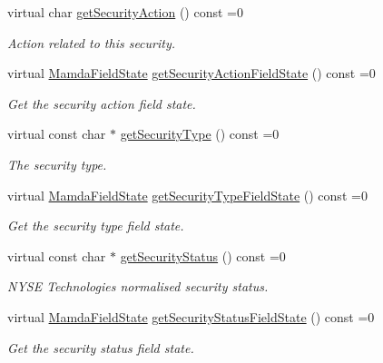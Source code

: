 \begin{CompactItemize}
\item 
virtual char \hyperlink{classWombat_1_1MamdaSecStatus_b143773aacba9fabb91693884ae8d87a}{get\-Security\-Action} () const =0
\begin{CompactList}\small\item\em Action related to this security. \item\end{CompactList}\item 
virtual \hyperlink{namespaceWombat_93aac974f2ab713554fd12a1fa3b7d2a}{Mamda\-Field\-State} \hyperlink{classWombat_1_1MamdaSecStatus_771481bb771bdd1bb86ab54be9e9247b}{get\-Security\-Action\-Field\-State} () const =0
\begin{CompactList}\small\item\em Get the security action field state. \item\end{CompactList}\item 
virtual const char $\ast$ \hyperlink{classWombat_1_1MamdaSecStatus_d3f39139bb90453ba077440f838b3d70}{get\-Security\-Type} () const =0
\begin{CompactList}\small\item\em The security type. \item\end{CompactList}\item 
virtual \hyperlink{namespaceWombat_93aac974f2ab713554fd12a1fa3b7d2a}{Mamda\-Field\-State} \hyperlink{classWombat_1_1MamdaSecStatus_ab32e4e57845c7982605e64abadbcaf0}{get\-Security\-Type\-Field\-State} () const =0
\begin{CompactList}\small\item\em Get the security type field state. \item\end{CompactList}\item 
virtual const char $\ast$ \hyperlink{classWombat_1_1MamdaSecStatus_ea108ad9235e4c39c8f5474cbb6c003f}{get\-Security\-Status} () const =0
\begin{CompactList}\small\item\em NYSE Technologies normalised security status. \item\end{CompactList}\item 
virtual \hyperlink{namespaceWombat_93aac974f2ab713554fd12a1fa3b7d2a}{Mamda\-Field\-State} \hyperlink{classWombat_1_1MamdaSecStatus_1b7b8b27b2bf2302c50b34261af61f39}{get\-Security\-Status\-Field\-State} () const =0
\begin{CompactList}\small\item\em Get the security status field state. \item\end{CompactList}\item 

\end{CompactItemize}
